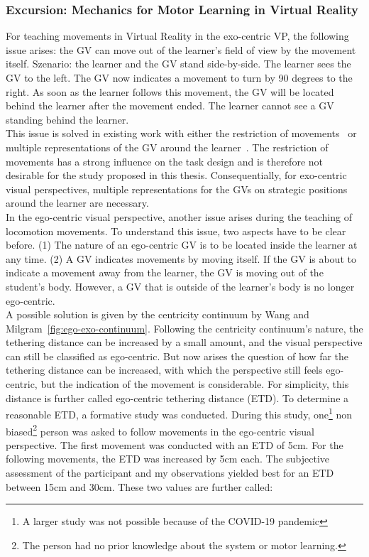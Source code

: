 \subsubsection{Excursion: Mechanics for Motor Learning in Virtual Reality}
For teaching movements in Virtual Reality in the exo-centric VP, the following issue arises: the GV can move out of the learner's field of view by the movement itself. Szenario: the learner and the GV stand side-by-side. The learner sees the GV to the left. The GV now indicates a movement to turn by 90 degrees to the right. As soon as the learner follows this movement, the GV will be located behind the learner after the movement ended. The learner cannot see a GV standing behind the learner.\\
This issue is solved in existing work with either the restriction of movements~\cite{freethrowsimulator,elearningma} or multiple representations of the GV around the learner~\cite{thaichichua,mythaichicoaches}. The restriction of movements has a strong influence on the task design and is therefore not desirable for the study proposed in this thesis. Consequentially, for exo-centric visual perspectives, multiple representations for the GVs on strategic positions around the learner are necessary.\\
In the ego-centric visual perspective, another issue arises during the teaching of locomotion movements. To understand this issue, two aspects have to be clear before. (1) The nature of an ego-centric GV is to be located inside the learner at any time. (2) A GV indicates movements by moving itself. If the GV is about to indicate a movement away from the learner, the GV is moving out of the student's body. However, a GV that is outside of the learner's body is no longer ego-centric.\\
A possible solution is given by the centricity continuum by Wang and Milgram~\ref{fig:ego-exo-continuum}. Following the centricity continuum's nature, the tethering distance can be increased by a small amount, and the visual perspective can still be classified as ego-centric. But now arises the question of how far the tethering distance can be increased, with which the perspective still feels ego-centric, but the indication of the movement is considerable. For simplicity, this distance is further called ego-centric tethering distance (ETD). To determine a reasonable ETD, a formative study was conducted. During this study, one\footnote{A larger study was not possible because of the COVID-19 pandemic} non biased\footnote{The person had no prior knowledge about the system or motor learning.} person was asked to follow movements in the ego-centric visual perspective. The first movement was conducted with an ETD of 5cm. For the following movements, the ETD was increased by 5cm each. The subjective assessment of the participant and my observations yielded best for an ETD between 15cm and 30cm. These two values are further called:

